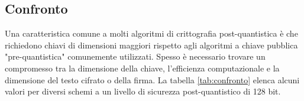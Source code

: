 \subsection{Confronto}
Una caratteristica comune a molti algoritmi di crittografia post-quantistica è che richiedono chiavi di dimensioni maggiori rispetto agli algoritmi a chiave pubblica "pre-quantistica" comunemente utilizzati. Spesso è necessario trovare un compromesso tra la dimensione della chiave, l'efficienza computazionale e la dimensione del testo cifrato o della firma. La tabella \ref{tab:confronto} elenca alcuni valori per diversi schemi a un livello di sicurezza post-quantistico di 128 bit.

\begin{table}[]
\end{table}
